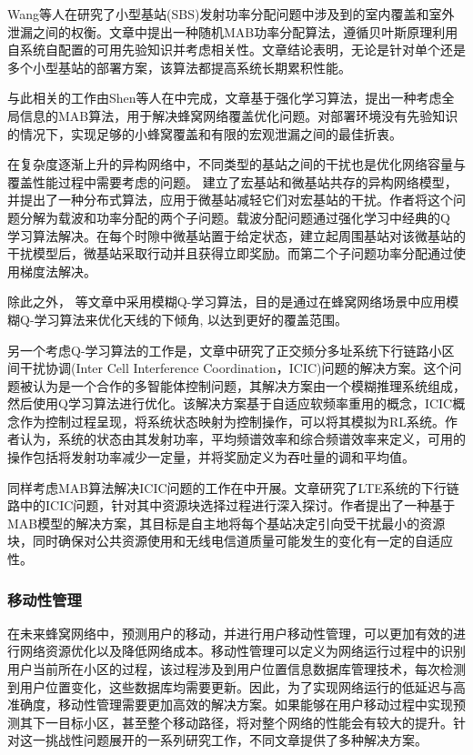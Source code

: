 ﻿\documentclass[11pt,draftclsnofoot,onecolumn,journal,letterpaper]{IEEEtran}
\begin{document}
Wang等人在\cite{Wang2017}研究了小型基站(SBS)发射功率分配问题中涉及到的室内覆盖和室外泄漏之间的权衡。文章中提出一种随机MAB功率分配算法，遵循贝叶斯原理利用自系统自配置的可用先验知识并考虑相关性。文章结论表明，无论是针对单个还是多个小型基站的部署方案，该算法都提高系统长期累积性能。

与此相关的工作由Shen等人在\cite{Shen2018}中完成，文章基于强化学习算法，提出一种考虑全局信息的MAB算法，用于解决蜂窝网络覆盖优化问题。对部署环境没有先验知识的情况下，实现足够的小蜂窝覆盖和有限的宏观泄漏之间的最佳折衷。

在复杂度逐渐上升的异构网络中，不同类型的基站之间的干扰也是优化网络容量与覆盖性能过程中需要考虑的问题。
\cite{Bennis2010}建立了宏基站和微基站共存的异构网络模型，并提出了一种分布式算法，应用于微基站减轻它们对宏基站的干扰。作者将这个问题分解为载波和功率分配的两个子问题。载波分配问题通过强化学习中经典的Q 学习算法解决。在每个时隙中微基站置于给定状态，建立起周围基站对该微基站的干扰模型后，微基站采取行动并且获得立即奖励。而第二个子问题功率分配通过使用梯度法解决。

除此之外，\cite{Razavi2010}\cite{Razavi2010a}\cite{Islam2012} 等文章中采用模糊Q-学习算法，目的是通过在蜂窝网络场景中应用模糊Q-学习算法来优化天线的下倾角, 以达到更好的覆盖范围。

另一个考虑Q-学习算法的工作是\cite{Dirani2010}，文章中研究了正交频分多址系统下行链路小区间干扰协调(Inter Cell Interference Coordination，ICIC)问题的解决方案。这个问题被认为是一个合作的多智能体控制问题，其解决方案由一个模糊推理系统组成，然后使用Q学习算法进行优化。该解决方案基于自适应软频率重用的概念，ICIC概念作为控制过程呈现，将系统状态映射为控制操作，可以将其模拟为RL系统。作者认为，系统的状态由其发射功率，平均频谱效率和综合频谱效率来定义，可用的操作包括将发射功率减少一定量，并将奖励定义为吞吐量的调和平均值。

同样考虑MAB算法解决ICIC问题的工作在\cite{Coucheney2015}中开展。文章研究了LTE系统的下行链路中的ICIC问题，针对其中资源块选择过程进行深入探讨。作者提出了一种基于MAB模型的解决方案，其目标是自主地将每个基站决定引向受干扰最小的资源块，同时确保对公共资源使用和无线电信道质量可能发生的变化有一定的自适应性。



\subsubsection{移动性管理}
在未来蜂窝网络中，预测用户的移动，并进行用户移动性管理，可以更加有效的进行网络资源优化以及降低网络成本。移动性管理可以定义为网络运行过程中的识别用户当前所在小区的过程，该过程涉及到用户位置信息数据库管理技术，每次检测到用户位置变化，这些数据库均需要更新。因此，为了实现网络运行的低延迟与高准确度，移动性管理需要更加高效的解决方案。如果能够在用户移动过程中实现预测其下一目标小区，甚至整个移动路径，将对整个网络的性能会有较大的提升。针对这一挑战性问题展开的一系列研究工作，不同文章提供了多种解决方案。
\end{document}
